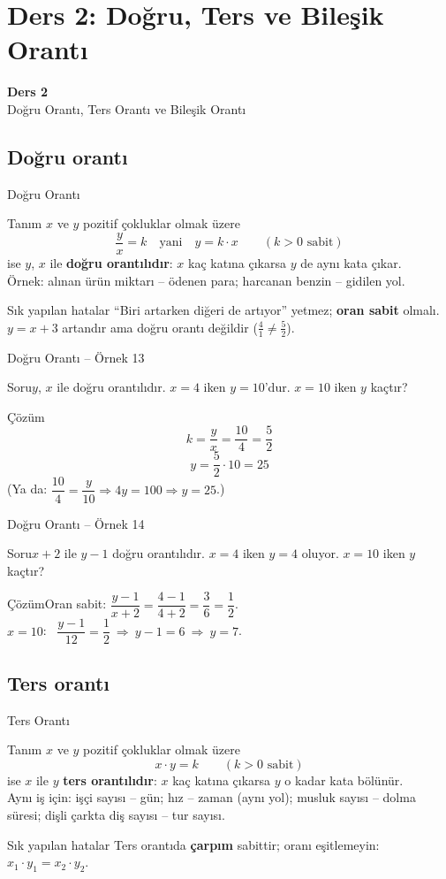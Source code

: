 \documentclass[aspectratio=169,11pt,handout]{beamer}
\newcommand{\soru}[3]{%
\begin{frame}{#1}
  \begin{block}{Soru}\large #2\end{block}
  \pause
  \begin{exampleblock}{Çözüm}\large #3\end{exampleblock}
\end{frame}}
\begin{document}
\section{Ders 2: Doğru, Ters ve Bileşik Orantı}
\begin{frame}
\centering\Large\color{anamavi}\textbf{Ders 2}\\[6pt]\normalsize Doğru Orantı, Ters Orantı ve Bileşik Orantı
\end{frame}

\subsection{Doğru orantı}
\begin{frame}{Doğru Orantı}
\begin{block}{Tanım}
\(x\) ve \(y\) pozitif çokluklar olmak üzere
\[\frac{y}{x}=k\quad\text{yani}\quad y=k\cdot x\qquad(k>0 \text{ sabit})\]
ise \(y\), \(x\) ile \textbf{doğru orantılıdır}: \(x\) kaç katına çıkarsa \(y\) de aynı kata çıkar.\\[2pt]
Örnek: alınan ürün miktarı -- ödenen para; harcanan benzin -- gidilen yol.
\end{block}
\begin{alertblock}{Sık yapılan hatalar}
``Biri artarken diğeri de artıyor'' yetmez; \textbf{oran sabit} olmalı.
\(y=x+3\) artandır ama doğru orantı değildir (\(\frac{4}{1}\neq\frac{5}{2}\)).
\end{alertblock}
\end{frame}

\soru{Doğru Orantı -- Örnek 13}
{\(y\), \(x\) ile doğru orantılıdır. \(x=4\) iken \(y=10\)'dur. \(x=10\) iken \(y\) kaçtır?}
{\[k=\frac{y}{x}=\frac{10}{4}=\frac{5}{2}\]
\[y=\frac{5}{2}\cdot 10=25\]
(Ya da: \(\dfrac{10}{4}=\dfrac{y}{10}\Rightarrow 4y=100\Rightarrow y=25\).)}

\soru{Doğru Orantı -- Örnek 14}
{\(x+2\) ile \(y-1\) doğru orantılıdır. \(x=4\) iken \(y=4\) oluyor. \(x=10\) iken \(y\) kaçtır?}
{Oran sabit: \(\dfrac{y-1}{x+2}=\dfrac{4-1}{4+2}=\dfrac{3}{6}=\dfrac{1}{2}\).\\[3pt]
\(x=10\): \ \(\dfrac{y-1}{12}=\dfrac{1}{2}\ \Rightarrow\ y-1=6\ \Rightarrow\ y=7\).}

\subsection{Ters orantı}
\begin{frame}{Ters Orantı}
\begin{block}{Tanım}
\(x\) ve \(y\) pozitif çokluklar olmak üzere
\[x\cdot y=k\qquad(k>0 \text{ sabit})\]
ise \(x\) ile \(y\) \textbf{ters orantılıdır}: \(x\) kaç katına çıkarsa \(y\) o kadar kata bölünür.\\[2pt]
Aynı iş için: işçi sayısı -- gün; hız -- zaman (aynı yol); musluk sayısı -- dolma süresi; dişli çarkta diş sayısı -- tur sayısı.
\end{block}
\begin{alertblock}{Sık yapılan hatalar}
Ters orantıda \textbf{çarpım} sabittir; oranı eşitlemeyin: \(x_1\cdot y_1=x_2\cdot y_2\).
\end{alertblock}
\end{frame}
\end{document}
